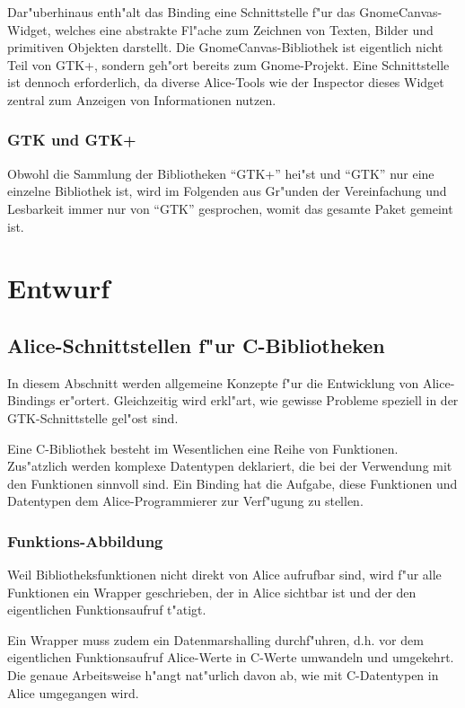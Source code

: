 \documentclass[a4paper,titlepage]{article}
\begin{document}
Dar"uberhinaus enth"alt das Binding eine Schnittstelle f"ur das
GnomeCanvas-Widget, welches eine abstrakte
Fl"ache zum Zeichnen von Texten, Bilder und primitiven
Objekten darstellt. Die GnomeCanvas-Bibliothek ist eigentlich nicht Teil
von GTK+, sondern geh"ort bereits zum Gnome-Projekt. Eine Schnittstelle ist 
dennoch erforderlich, da diverse Alice-Tools
wie der Inspector dieses Widget zentral zum Anzeigen von Informationen
nutzen.

\subsubsection*{GTK und GTK+}

Obwohl die Sammlung der Bibliotheken ``GTK+'' hei"st und ``GTK'' nur eine
einzelne Bibliothek ist, wird im Folgenden aus Gr"unden der Vereinfachung
und Lesbarkeit immer nur von ``GTK'' gesprochen, womit das gesamte
Paket gemeint ist.


\section{Entwurf}

\subsection{Alice-Schnittstellen f"ur C-Bibliotheken}

In diesem Abschnitt werden allgemeine Konzepte f"ur die Entwicklung von
Alice-Bindings er"ortert. Gleichzeitig wird erkl"art,
wie gewisse Probleme speziell in der GTK-Schnittstelle gel"ost sind.

Eine C-Bibliothek besteht im Wesentlichen eine Reihe von Funktionen.
Zus"atzlich werden komplexe Datentypen deklariert, die bei der Verwendung
mit den Funktionen sinnvoll sind. Ein Binding hat die Aufgabe, diese
Funktionen und Datentypen dem Alice-Programmierer zur Verf"ugung zu stellen.

\subsubsection*{Funktions-Abbildung}

Weil Bibliotheksfunktionen nicht direkt von Alice aufrufbar sind,
wird f"ur alle Funktionen ein Wrapper geschrieben, der in Alice
sichtbar ist und der den eigentlichen Funktionsaufruf t"atigt.

Ein Wrapper muss zudem ein Datenmarshalling durchf"uhren, d.h. vor
dem eigentlichen Funktionsaufruf Alice-Werte in C-Werte umwandeln und
umgekehrt. Die genaue Arbeitsweise h"angt nat"urlich davon ab, wie mit
C-Datentypen in Alice umgegangen wird.
\end{document}
